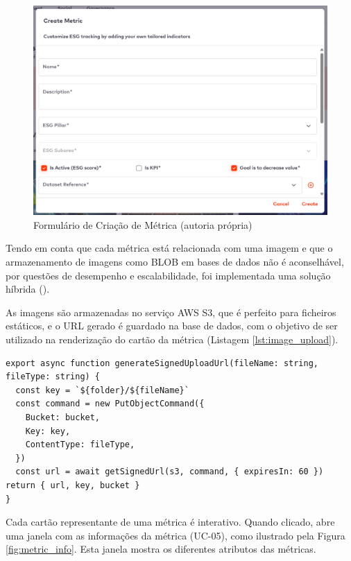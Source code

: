 \begin{figure}[H]
    \centering
    \includegraphics[width=4.5in,keepaspectratio]{frontmatter/assets/platform_prints/metrics/metric_creation.png}
    \caption{Formulário de Criação de Métrica (autoria própria)}
    \label{fig:metric_creation}
\end{figure}

Tendo em conta que cada métrica está relacionada com uma imagem e que o armazenamento de imagens como BLOB em bases de dados não é aconselhável, por questões de desempenho e escalabilidade, foi implementada uma solução híbrida (\cite{code-examplesnet2025}).

As imagens são armazenadas no serviço AWS S3, que é perfeito para ficheiros estáticos, e o URL gerado é guardado na base de dados, com o objetivo de ser utilizado na renderização do cartão da métrica (Listagem \ref{lst:image_upload}).

\newpage

\begin{lstlisting}[style=customts, caption={Função de \textit{Upload} de uma imagem para o AWS S3}, label={lst:image_upload}]
export async function generateSignedUploadUrl(fileName: string, fileType: string) {
  const key = `${folder}/${fileName}`
  const command = new PutObjectCommand({
    Bucket: bucket,
    Key: key,
    ContentType: fileType,
  })
  const url = await getSignedUrl(s3, command, { expiresIn: 60 })
return { url, key, bucket }
}
\end{lstlisting}

Cada cartão representante de uma métrica é interativo. Quando clicado, abre uma janela com as informações da métrica (UC-05), como ilustrado pela Figura \ref{fig:metric_info}. Esta janela mostra os diferentes atributos das métricas.

